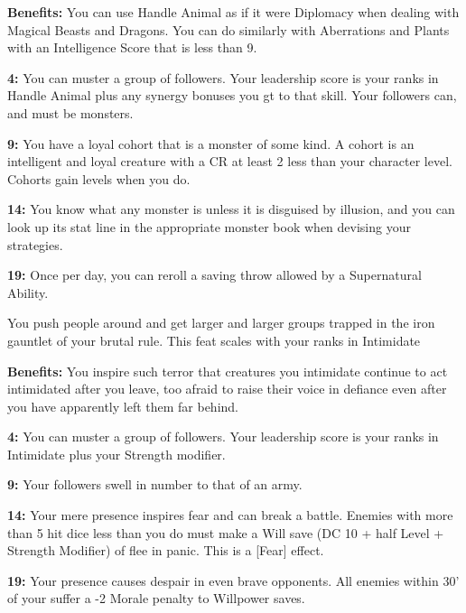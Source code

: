\textbf{Benefits:} You can use Handle Animal as if it were Diplomacy when dealing with Magical Beasts and Dragons. You can do similarly with Aberrations and Plants with an Intelligence Score that is less than 9.

\textbf{4:} You can muster a group of followers. Your leadership score is your ranks in Handle Animal plus any synergy bonuses you gt to that skill. Your followers can, and must be monsters.

\textbf{9:} You have a loyal cohort that is a monster of some kind. A cohort is an intelligent and loyal creature with a CR at least 2 less than your character level. Cohorts gain levels when you do.

\textbf{14:} You know what any monster is unless it is disguised by illusion, and you can look up its stat line in the appropriate monster book when devising your strategies.

\textbf{19:} Once per day, you can reroll a saving throw allowed by a Supernatural Ability.

You push people around and get larger and larger groups trapped in the iron gauntlet of your brutal rule. This feat scales with your ranks in Intimidate

\textbf{Benefits:} You inspire such terror that creatures you intimidate continue to act intimidated after you leave, too afraid to raise their voice in defiance even after you have apparently left them far behind.

\textbf{4:} You can muster a group of followers. Your leadership score is your ranks in Intimidate plus your Strength modifier.

\textbf{9:} Your followers swell in number to that of an army.

\textbf{14:} Your mere presence inspires fear and can break a battle. Enemies with more than 5 hit dice less than you do must make a Will save (DC 10 + half Level + Strength Modifier) of flee in panic. This is a [Fear] effect.

\textbf{19:} Your presence causes despair in even brave opponents. All enemies within 30' of your suffer a -2 Morale penalty to Willpower saves.
